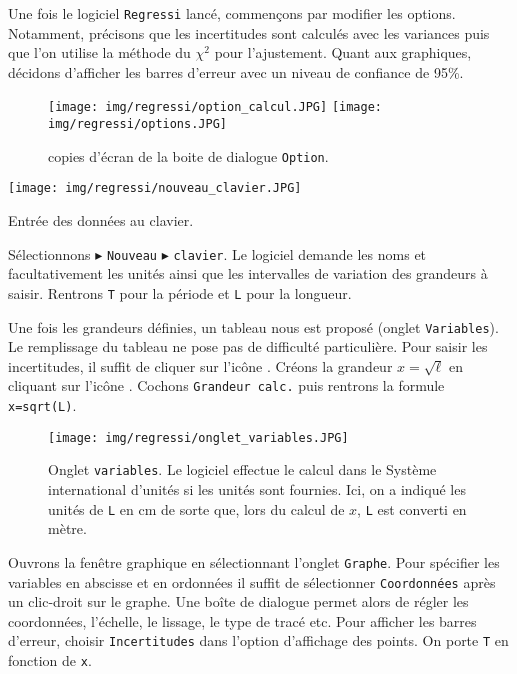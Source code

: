Une fois le logiciel \texttt{Regressi} lancé, commençons par modifier les options. Notamment, précisons que les incertitudes sont calculés avec les variances puis que l'on utilise la méthode du $\chi^2$ pour l'ajustement. Quant aux graphiques, décidons d'afficher les barres d'erreur avec un niveau de confiance de 95\%.
\begin{figure*}[htbp]
    \texttt{[image: img/regressi/option\_calcul.JPG]}
	\quad
	\texttt{[image: img/regressi/options.JPG]}
	\caption{copies d'écran de la boite de dialogue \texttt{Option}.}
\end{figure*}

\begin{marginfigure}[*1]
\centering
	\texttt{[image: img/regressi/nouveau\_clavier.JPG]}
\caption{Entrée des données au clavier.}
\end{marginfigure}
Sélectionnons  $\blacktriangleright$ \texttt{Nouveau}  $\blacktriangleright$  \texttt{clavier}. Le logiciel demande les noms et facultativement les unités ainsi que les intervalles de variation des grandeurs à saisir. Rentrons \texttt{T} pour la période et \texttt{L} pour la longueur. 

Une fois les grandeurs définies, un tableau nous est proposé (onglet \texttt{Variables}). Le remplissage du tableau ne pose pas de difficulté particulière. Pour saisir les incertitudes, il suffit de cliquer sur l'icône \fbox{$\sigma$}. Créons la grandeur $x=\sqrt{\ell}$ en cliquant sur l'icône . Cochons \texttt{Grandeur calc.} puis rentrons la formule \texttt{x=sqrt(L)}. 
\begin{figure}[htbp]
\centering
   \texttt{[image: img/regressi/onglet\_variables.JPG]}	
\caption{Onglet \texttt{variables}. Le logiciel effectue le calcul dans le Système international d'unités si les unités sont fournies. Ici, on a indiqué les unités de \texttt{L} en cm de sorte que, lors du calcul de $x$, \texttt{L} est converti en mètre.}
\end{figure}

Ouvrons la fenêtre graphique en sélectionnant l'onglet \texttt{Graphe}. Pour spécifier les variables en abscisse et en ordonnées il suffit de sélectionner \texttt{Coordonnées} après un clic-droit sur le graphe. Une boîte de dialogue permet alors de régler les coordonnées, l'échelle, le lissage, le type de tracé etc. Pour afficher les barres d'erreur, choisir \texttt{Incertitudes} dans l'option d'affichage des points. On porte \texttt{T} en fonction de \texttt{x}.	

